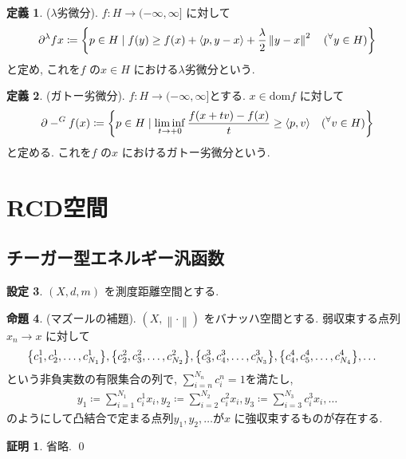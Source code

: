 \documentclass[10pt, fleqn, label-section=none]{bxjsarticle}
\theoremstyle{definition}
\newtheorem{dfn}{定義}[section]
\newtheorem{prop}[dfn]{命題}
\newtheorem{setting}[dfn]{設定}
\newtheorem*{pf*}{証明}
\newcommand{\any}{{}^{\forall}}
\newcommand{\cbra}[1]{\mleft\{#1\mright\}}
\newcommand{\tbra}[1]{\mleft\langle#1\mright\rangle}
\newcommand{\norm}[1]{\left\|#1\right\|}
\renewcommand{\;}{\, ; \,}
\begin{document}
\begin{dfn}($\lambda$劣微分). $f: H \rightarrow ( - \infty, \infty] $ に対して 
\begin{align*} \partial^\lambda f x \coloneqq \cbra{p \in H \mid f(y) \geq f(x) + \tbra{p, y-x} + \frac{\lambda}{2} \norm{y-x}^2 \quad (\any y \in H)  }\end{align*}
と定め, これを$f$ の$x \in H$ における$\lambda$劣微分という. 
\end{dfn}

\begin{dfn}(ガトー劣微分). $f: H \rightarrow (-\infty, \infty]$とする. $x \in \textrm{dom} f$ に対して
\begin{align*} \partial-^G f (x) \coloneqq \cbra{p \in H \mid \liminf_{t \rightarrow +0} \frac{f(x + tv) - f(x) }{t} \geq \tbra{p, v} \quad (\any v \in H)}\end{align*}
と定める. これを$f$ の$x$ におけるガトー劣微分という. 
\end{dfn}

\section{RCD空間}

\subsection{チーガー型エネルギー汎函数}

\begin{setting}
$(X, d, m)$ を測度距離空間とする. 
\end{setting}

\begin{prop}(マズールの補題). $(X, \norm \cdot )$ をバナッハ空間とする. 弱収束する点列$x_n \rightarrow x$ に対して
\begin{align*} &\cbra{c^1_1, c^1_2, \ldots , c^1_{N_1}}, \cbra{c^2_2, c^2_3, \ldots , c^2_{N_2}}, \cbra{c^3_3, c^3_{4}, \ldots , c^3_{N_3} } , \cbra{c^4_4, c^4_{5}, \ldots, c^4_{N_4}}, \ldots    \end{align*}
という非負実数の有限集合の列で, $\sum_{i = n }^{N_n} c^n_i = 1$を満たし, 
\begin{align*} y_1 \coloneqq \sum_{i = 1}^{N_1} c^1_i x_i , y_2 \coloneqq \sum_{i = 2}^{N_2} c^2_i x_i , y_3 \coloneqq \sum_{i = 3}^{N_3} c^3_i x_i , \ldots \end{align*}
のようにして凸結合で定まる点列$y_1, y_2, \ldots $が$x$ に強収束するものが存在する. 
\end{prop}
\begin{pf*}
省略. 
\qed
\end{pf*}
\end{document}
